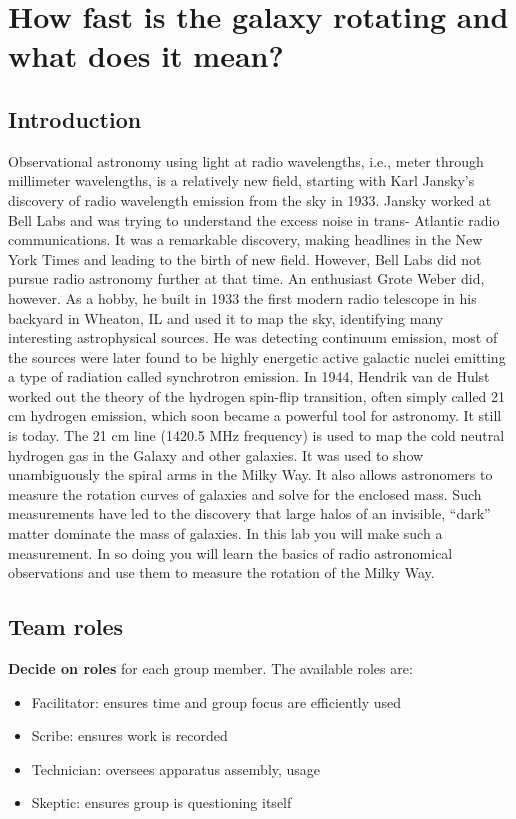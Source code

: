 \chapter{How fast is the galaxy rotating and what does it mean?}

\section{Introduction}

Observational astronomy using light at radio wavelengths, i.e., meter
through millimeter wavelengths, is a relatively new field, starting with Karl
Jansky’s discovery of radio wavelength emission from the sky in 1933. Jansky
worked at Bell Labs and was trying to understand the excess noise in trans-
Atlantic radio communications. It was a remarkable discovery, making headlines
in the New York Times and leading to the birth of new field. However, Bell Labs
did not pursue radio astronomy further at that time. An enthusiast Grote Weber
did, however. As a hobby, he built in 1933 the first modern radio telescope in his
backyard in Wheaton, IL and used it to map the sky, identifying many interesting
astrophysical sources. He was detecting continuum emission, most of the
sources were later found to be highly energetic active galactic nuclei emitting a
type of radiation called synchrotron emission. In 1944, Hendrik van de Hulst
worked out the theory of the hydrogen spin-flip transition, often simply called 21
cm hydrogen emission, which soon became a powerful tool for astronomy. It still
is today. The 21 cm line (1420.5 MHz frequency) is used to map the cold neutral
hydrogen gas in the Galaxy and other galaxies. It was used to show
unambiguously the spiral arms in the Milky Way. It also allows astronomers to
measure the rotation curves of galaxies and solve for the enclosed mass. Such
measurements have led to the discovery that large halos of an invisible, “dark”
matter dominate the mass of galaxies. In this lab you will make such a
measurement. In so doing you will learn the basics of radio astronomical
observations and use them to measure the rotation of the Milky Way.

\section{Team roles}

\textbf{Decide on roles} for each group member. The available roles are:

\begin{itemize}
	\item Facilitator: ensures time and group focus are efficiently used
	\item Scribe: ensures work is recorded
	\item Technician: oversees apparatus assembly, usage
	\item Skeptic: ensures group is questioning itself
\end{itemize}

